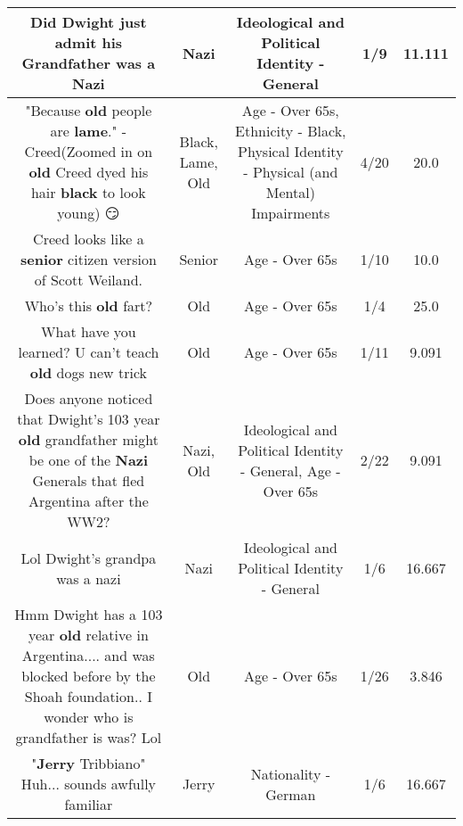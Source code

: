 \documentclass[11pt]{article}
\newlength\mylength
\begin{document}
\begin{center}
\begin{longtable}{|C{.65\mylength}|C{.30\mylength}|C{.12\mylength}|C{.12\mylength}|C{.12\mylength}|}
  \small Did Dwight just admit his Grandfather was a Nazi\normalsize   & Nazi &  Ideological and Political Identity - General & 1/9 & 11.111 \\  \hline
  \small "Because \textbf{old} people are \textbf{lame}." - Creed(Zoomed in on \textbf{old} Creed dyed his hair \textbf{black} to look young) 😏\normalsize   & Black, Lame, Old & Age - Over 65s, Ethnicity - Black, Physical Identity - Physical (and Mental) Impairments & 4/20 & 20.0 \\  \hline
  \small Creed looks like a \textbf{senior} citizen version of Scott Weiland.\normalsize   & Senior & Age - Over 65s & 1/10 & 10.0 \\  \hline
  \small Who's this \textbf{old} fart?\normalsize   & Old & Age - Over 65s & 1/4 & 25.0 \\  \hline
  \small What have you learned? U can't teach \textbf{old} dogs new trick\normalsize   & Old & Age - Over 65s & 1/11 & 9.091 \\  \hline
  \small Does anyone noticed that Dwight's 103 year \textbf{old} grandfather might be one of the \textbf{Nazi} Generals that fled Argentina after the WW2?\normalsize   & Nazi, Old &  Ideological and Political Identity - General, Age - Over 65s & 2/22 & 9.091 \\  \hline
  \small Lol Dwight's grandpa was a nazi\normalsize   & Nazi &  Ideological and Political Identity - General & 1/6 & 16.667 \\  \hline
  \small Hmm Dwight has a 103 year \textbf{old} relative in Argentina.... and was blocked before by the Shoah foundation.. I wonder who is grandfather is was? Lol\normalsize   & Old & Age - Over 65s & 1/26 & 3.846 \\  \hline
  \small "\textbf{Jerry} Tribbiano" Huh... sounds awfully familiar\normalsize   & Jerry & Nationality - German & 1/6 & 16.667 \\  \hline

\end{longtable}
\end{center}
\end{document}
